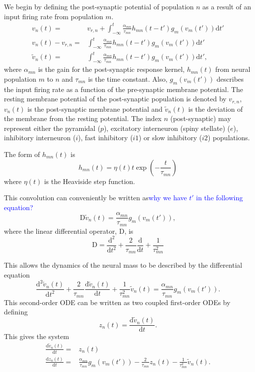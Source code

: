 \documentclass[]{article}
\newcommand{\parham}[1]{\textcolor{blue}{#1}}
\begin{document}
We begin by defining the post-synaptic potential of population $n$ as a result of an input firing rate from population $m$.
\begin{align}
	v_n(t) =& v_{r,n} + \int_{-\infty}^t \frac{\alpha_{mn}}{\tau_{mn}} h_{mn}(t-t')g_m(v_m(t')) \mathrm{d}t' \\
	v_n(t) - v_{r,n} =& \int_{-\infty}^t \frac{\alpha_{mn}}{\tau_{mn}} h_{mn}(t-t')g_m(v_m(t')) \mathrm{d}t' \\
	\tilde v_n(t) =& \int_{-\infty}^t \frac{\alpha_{mn}}{\tau_{mn}} h_{mn}(t-t')g_m(v_m(t')) \mathrm{d}t',
\end{align}
where $\alpha_{mn}$ is the gain for the post-synaptic response kernel, $h_{mn}(t)$ from neural population $m$ to $n$ and $\tau_{mn}$ is the time constant. Also, $g_m(v_m(t'))$ describes the input firing rate as a function of the pre-synaptic membrane potential. The resting membrane potential of the post-synaptic population is denoted by $v_{r,n}$, $v_n(t)$ is the post-synaptic membrane potential and $\tilde v_n(t)$ is the deviation of the membrane from the resting potential. The index $n$ (post-synaptic) may represent either the pyramidal ($p$), excitatory interneuron (spiny stellate) ($e$), inhibitory interneuron ($i$), fast inhibitory ($i1$) or slow inhibitory ($i2$) populations.  

The form of $h_{mn}(t)$ is 
\begin{equation}
	h_{mn}(t) = \eta(t)t\exp\left(-\frac{t}{\tau_{mn}}\right)
\end{equation}
where $\eta(t)$ is the Heaviside step function.

This convolution can conveniently be written as\parham{why we have $t'$ in the following equation?} 
\begin{equation}
	\mathrm{D}\tilde v_n(t) = \frac{\alpha_{mn}}{\tau_{mn}} g_m(v_m(t')),
\end{equation}
where the linear differential operator, $\mathrm{D}$, is
\begin{equation}
	\mathrm{D} = \frac{\mathrm{d}^2}{\mathrm{d}t^2} + \frac{2}{\tau_{mn}}\frac{\mathrm{d}}{\mathrm{d}t} + \frac{1}{\tau_{mn}^2}
\end{equation}

This allows the dynamics of the neural mass to be described by the differential equation
\begin{equation}
	\frac{\mathrm{d}^2\tilde v_n(t)}{\mathrm{d}t^2} + \frac{2}{\tau_{mn}}\frac{\mathrm{d}\tilde v_n(t)}{\mathrm{d}t} + \frac{1}{\tau_{mn}^2}\tilde v_n(t) = \frac{\alpha_{mn}}{\tau_{mn}} g_m(v_m(t')).
\end{equation}
This second-order ODE can be written as two coupled first-order ODEs by defining
\begin{equation}
	z_n(t) = \frac{\mathrm{d}\tilde v_n(t)}{\mathrm{d}t}.
\end{equation}
This gives the system
\begin{align}
	\frac{\mathrm{d}\tilde v_n(t)}{\mathrm{d}t} =& z_n(t) \\
	\frac{\mathrm{d}z_n(t)}{\mathrm{d}t} =& \frac{\alpha_{mn}}{\tau_{mn}} g_m(v_m(t')) - \frac{2}{\tau_{mn}}z_n(t) - \frac{1}{\tau_{mn}^2}\tilde v_n(t).
\end{align}
\end{document}
